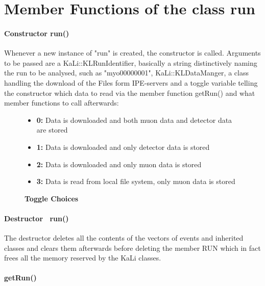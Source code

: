  \section{Member Functions of the class {\bf run}}
  \label{ch:Analysis software:sec:methods of the class run}
  
    \paragraph{Constructor run()}
    \label{ch:Analysis software:sec:methods of the class run:subsec:Constructor}
    Whenever a new instance of "run" is created, the constructor is called. Arguments to be passed are a KaLi::KLRunIdentifier, basically a string distinctively naming the run to be analysed, such as "myo00000001", KaLi::KLDataManger, a class handling the download of the Files form IPE-servers and a toggle variable telling the constructor which data to read via the member function getRun() and what member functions to call afterwards:
    \begin{figure}
    \caption*{\bf Toggle Choices}
    	\begin{itemize}
    		\item {\bf 0:} Data is downloaded and both muon data and detector data are stored
    		\item {\bf 1:} Data is downloaded and only detector data is stored
    		\item {\bf 2:} Data is downloaded and only muon data is stored
    		\item {\bf 3:} Data is read from local file system, only muon data is stored
    	\end{itemize}
    \end{figure}
    
    \paragraph{Destructor ~run()}
    \label{ch:Analysis software:sec:methods of the class run:subsec:destructor}
    The destructor deletes all the contents of the vectors of events and inherited classes and clears them afterwards before deleting the member RUN which in fact frees all the memory reserved by the KaLi classes.
    
    \paragraph{getRun()}
    \label{ch:Analysis software:sec:methods of the class run:subsec:getRun()}
    
